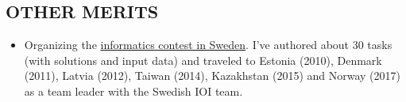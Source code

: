 \documentclass[11pt]{res} %
\begin{document}
\begin{resume}
\section{OTHER MERITS}

\begin{itemize} %
  \item Organizing the \href{http://progolymp.se/}{informatics contest in Sweden}.
    I've authored about
    30 tasks (with solutions and input data) and traveled to Estonia (2010),
    Denmark (2011), Latvia (2012), Taiwan (2014), Kazakhstan (2015) and Norway (2017) as a
    team leader with the Swedish IOI team.
\end{itemize}

\end{resume}
\end{document}
